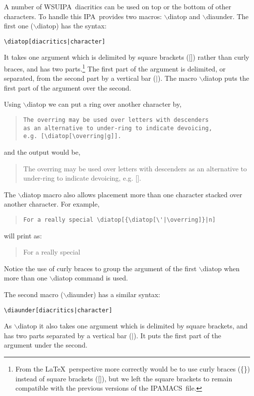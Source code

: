 \documentclass[12pt]{article}
\newcommand{\B}[1]{$\backslash$#1}
\newcommand{\wsu}{{\small\rm WSUIPA}}
\newcommand{\ipam}{{\small\rm IPAMACS}}
\newcommand{\ipas}{{\small\rm IPA}}
\begin{document}
A number of \wsu\ diacritics can be used on top or the bottom of other
characters. To handle this \ipas\ provides two macros: \B{diatop} and
\B{diaunder}. The first one (\B{diatop}) has the syntax:
%
\begin{center}
\verb+\diatop[diacritics|character]+
\end{center}
%
It takes one argument which is delimited by square brackets ([])
rather than curly braces, and has two parts.\footnote{From the \LaTeX\
perspective more correctly would be to use curly braces (\{\}) instead
of square brackets ([]), but we left the square brackets to remain
compatible with the previous versions of the \ipam\ file.}
%
The first part of the argument is delimited, or separated, from the
second part by a vertical bar ($\vert$). The macro \B{diatop} puts the
first part of the argument over the second.

Using \B{diatop} we can put a ring over another character by,
%
\begin{quote}\begin{verbatim}
The overring may be used over letters with descenders
as an alternative to under-ring to indicate devoicing,
e.g. [\diatop[\overring|g]].
\end{verbatim}\end{quote}
%
and the output would be,
%
\begin{quote}
The overring may be used over letters with descenders as an
alternative to under-ring to indicate devoicing, e.g.
[\diatop[\overring|g]].
\end{quote}

The \B{diatop} macro also allows placement more than one character
stacked over another character. For example,
%
\begin{quote}\begin{verbatim}
For a really special \diatop[{\diatop[\'|\overring]}|n]
\end{verbatim}\end{quote}
%
will print as:
%
\begin{quote}
For a really special \diatop[{\diatop[\'|\overring]}|n]
\end{quote}
%
Notice the use of curly braces to group the argument of the first \B{diatop}
when more than one \B{diatop} command is used.

The second macro (\B{diaunder}) has a similar syntax:
%
\begin{center}
\verb+\diaunder[diacritics|character]+
\end{center}
%
As \B{diatop} it also takes one argument which is delimited by square
brackets, and has two parts separated by a vertical bar ($\vert$). It
puts the first part of the argument under the second.
\end{document}
